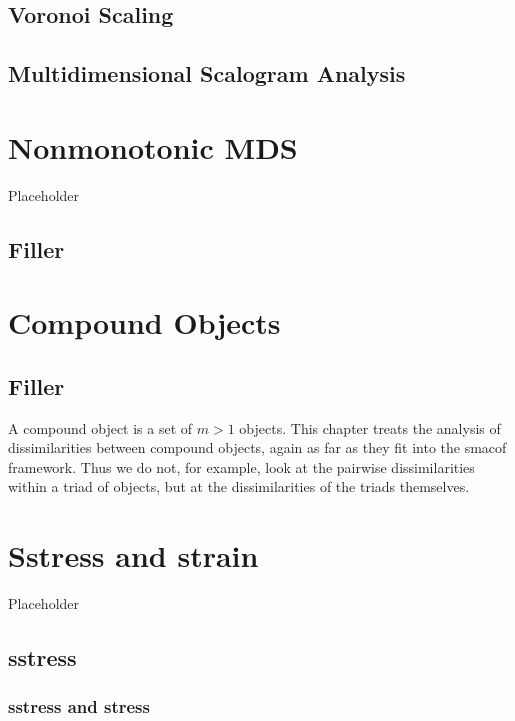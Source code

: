 \documentclass[
  12pt,
]{book}
\begin{document}
\section{Voronoi Scaling}\label{voronoi-scaling}

\section{Multidimensional Scalogram Analysis}\label{multidimensional-scalogram-analysis}

\chapter{Nonmonotonic MDS}\label{nonmonotonic}

Placeholder

\section{Filler}\label{filler}

\chapter{Compound Objects}\label{compound}

\section{Filler}\label{filler-1}

A compound object is a set of \(m>1\) objects. This chapter treats the
analysis of dissimilarities between compound objects, again as far as they fit into the smacof framework. Thus we do not, for example, look at the
pairwise dissimilarities within a triad of objects, but at the dissimilarities of the triads themselves.

\chapter{Sstress and strain}\label{chsstressstrain}

Placeholder

\section{sstress}\label{sstress}

\subsection{sstress and stress}\label{sstress-and-stress}
\end{document}
